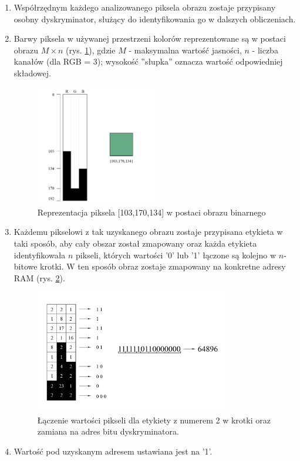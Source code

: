 \begin{enumerate}
\item Współrzędnym każdego analizowanego piksela obrazu zostaje przypisany osobny dyskryminator, służący do identyfikowania go w dalszych obliczeniach.
\item Barwy piksela w używanej przestrzeni kolorów reprezentowane są w postaci obrazu $M \times n$ (rys. \ref{fig:binPixel}), gdzie $M$ - maksymalna wartość jasności, $n$ - liczba kanałów (dla RGB = 3); wysokość ''słupka'' oznacza wartość odpowiedniej składowej.

\begin{figure}[!h]
\centering
\includegraphics[width=0.5\textwidth]{img/binPixel}
\caption{Reprezentacja piksela [103,170,134] w postaci obrazu binarnego \label{fig:binPixel}}
\end{figure}

\item Każdemu pikselowi z tak uzyskanego obrazu zostaje przypisana etykieta w taki sposób, aby cały obszar został zmapowany oraz każda etykieta identyfikowała $n$ pikseli, których wartości '0' lub '1' łączone są kolejno w $n$-bitowe krotki. W ten sposób obraz zostaje zmapowany na konkretne adresy RAM (rys. \ref{fig:map}).

\begin{figure}[!h]
\centering
\includegraphics[width=0.8\textwidth]{img/map}
\caption{Łączenie wartości pikseli dla etykiety z numerem 2 w krotki oraz zamiana na adres bitu dyskryminatora.\label{fig:map}}
\end{figure}


\item Wartość pod uzyskanym adresem ustawiana jest na '1'.
\end{enumerate}
